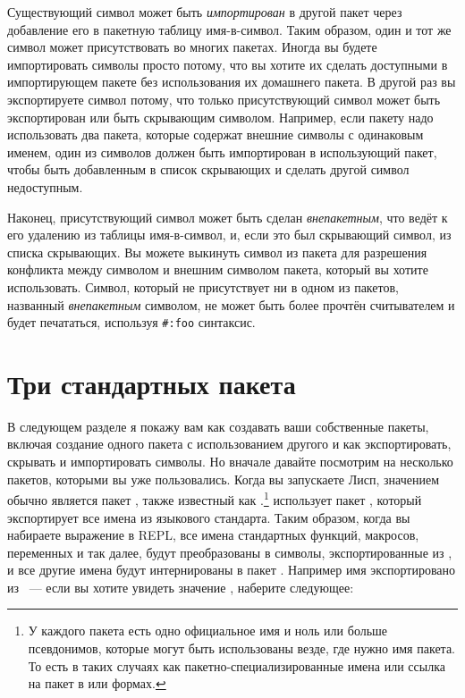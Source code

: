 Существующий символ может быть \textit{импортирован} в другой пакет через добавление его в
пакетную таблицу имя-в-символ.  Таким образом, один и тот же символ может присутствовать
во многих пакетах. Иногда вы будете импортировать символы просто потому, что вы хотите их
сделать доступными в импортирующем пакете без использования их домашнего пакета. В другой
раз вы экспортируете символ потому, что только присутствующий символ может быть
экспортирован или быть скрывающим символом. Например, если пакету надо использовать два
пакета, которые содержат внешние символы с одинаковым именем, один из символов должен быть
импортирован в использующий пакет, чтобы быть добавленным в список скрывающих и сделать
другой символ недоступным.

Наконец, присутствующий символ может быть сделан \textit{внепакетным}, что ведёт к его
удалению из таблицы имя-в-символ, и, если это был скрывающий символ, из списка скрывающих.
Вы можете выкинуть символ из пакета для разрешения конфликта между символом и внешним
символом пакета, который вы хотите использовать. Символ, который не присутствует ни в
одном из пакетов, названный \textit{внепакетным} символом, не может быть более прочтён
считывателем и будет печататься, используя \lstinline!#:foo! синтаксис.

\section{Три стандартных пакета}
 
В следующем разделе я покажу вам как создавать ваши собственные пакеты, включая создание
одного пакета с использованием другого и как экспортировать, скрывать и импортировать
символы. Но вначале давайте посмотрим на несколько пакетов, которыми вы уже
пользовались. Когда вы запускаете Лисп, значением  обычно является пакет
, также известный как .\footnote{У каждого пакета
  есть одно официальное имя и ноль или больше псевдонимов, которые могут быть использованы
  везде, где нужно имя пакета. То есть в таких случаях как пакетно-специализированные
  имена или ссылка на пакет в  или  формах.}
 использует пакет , который экспортирует все имена из
языкового стандарта. Таким образом, когда вы набираете выражение в REPL, все имена
стандартных функций, макросов, переменных и так далее, будут преобразованы в символы,
экспортированные из , и все другие имена будут интернированы в пакет
. Например имя  экспортировано из
~--- если вы хотите увидеть значение , наберите
следующее:

